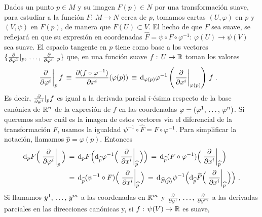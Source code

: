 \theoremstyle{plain}

\theoremstyle{remark}
\newtheorem{obsSiLasCartasNoSonCompatibles}{Observaci\'{o}n}[section]


Dados un punto $p\in M$ y su imagen $F(p)\in N$ por una transformaci\'{o}n
suave, para estudiar a la funci\'{o}n $F:\,M\rightarrow N$ cerca de $p$,
tomamos cartas $(U,\varphi)$ en $p$ y $(V,\psi)$ en $F(p)$, de manera que
$F(U)\subset V$. El hecho de que $F$ sea suave, se reflejar\'{a} en que su
expresi\'{o}n en coordenadas $\widehat{F}=\psi\circ F\circ\varphi^{-1}:\,%
\varphi(U)\rightarrow\psi(V)$ sea suave. El espacio tangente en $p$ tiene
como base a los vectores $\{\gancho{\varphi^{1}}|_{p},\,\dots,\,%
\gancho{\varphi^{n}}|_{p}\}$ que, en una funci\'{o}n suave
$f:\,U\rightarrow\mathbb{R}$ toman los valores
\begin{align*}
	\left.\gancho{\varphi^{i}}\right|_{p}f & \,\equiv\,
		\derivada{(f\circ\varphi^{-1})}{x^{i}}(\varphi(p))
		\,\equiv\, \diferencial[\varphi(p)]{\varphi^{-1}}
		\left(\left.\gancho{x^{i}}\right|_{\varphi(p)}\right)\,f
	\text{ .}
\end{align*}
%
Es decir, $\gancho{\varphi^{i}}|_{p}f$ es igual a la derivada parcial
$i$-\'{e}sima respecto de la base can\'{o}nica de $\mathbb{R}^{n}$ de la
expresi\'{o}n de $f$ en las coordenadas $\varphi=(\lista*{\varphi}{n})$.
Si queremos saber cu\'{a}l es la imagen de estos vectores v\'{\i}a el
diferencial de la transformaci\'{o}n $F$, usamos la igualdad
$\psi^{-1}\circ\widehat{F}=F\circ\varphi^{-1}$. Para simplificar la
notaci\'{o}n, llamamos $\widehat{p}=\varphi(p)$. Entonces
\begin{align*}
	\diferencial[p]{F}\Big(\left.\gancho{\varphi^{i}}\right|_{p}\Big) &
		\,=\,\diferencial[p]{F}\Big(
			\diferencial[\widehat{p}]{\varphi^{-1}}\Big(
			\left.\gancho{x^{i}}\right|_{\widehat{p}}
			\Big)
		\Big)
		\,=\,\diferencial[\widehat{p}]{(F\circ\varphi^{-1})}\Big(
			\left.\gancho{x^{i}}\right|_{\widehat{p}}
			\Big) \\
	& \,=\,\diferencial[\widehat{p}]{(\psi^{-1}\circ F)}\Big(
			\left.\gancho{x^{i}}\right|_{\widehat{p}}
			\Big)
		\,=\,\diferencial[\widehat{F}(\widehat{p})]{\psi^{-1}}\Big(
		\diferencial[\widehat{p}]{\widehat{F}}\Big(
			\left.\gancho{x^{i}}\right|_{\widehat{p}}
			\Big)
		\Big)
	\text{ .}
\end{align*}
%
Si llamamos $\lista*{y}{m}$ a las coordenadas en $\mathbb{R}^{m}$ y
$\gancho{y^{1}},\,\dots,\,\gancho{y^{m}}$ a las derivadas parciales en las
direcciones can\'{o}nicas y, si $f:\,\psi(V)\rightarrow\mathbb{R}$ es suave,
